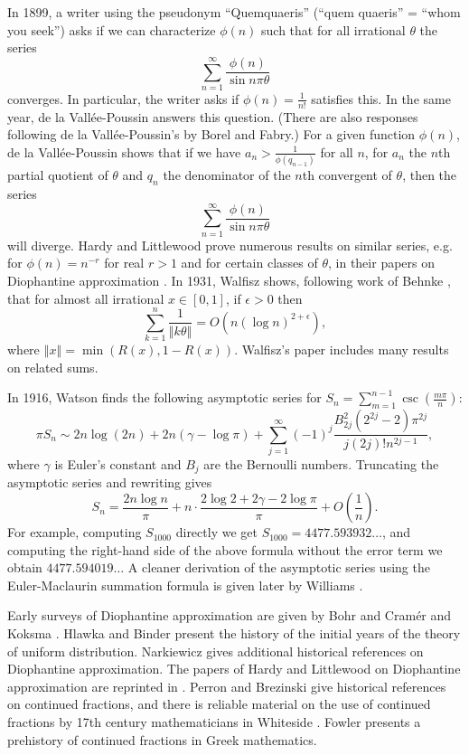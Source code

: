 \documentclass{article}
\newcommand{\norm}[1]{\left\Vert #1 \right\Vert}
\begin{document}
In 1899, a writer using the pseudonym ``Quemquaeris''  \cite{quemquaeris} (``quem quaeris'' = ``whom you seek'') asks if we can characterize $\phi(n)$ such that for
all  irrational $\theta$
the series
\[
\sum_{n=1}^\infty \frac{\phi(n)}{\sin n\pi \theta}
\]
converges.
 In particular, the writer asks if $\phi(n)=\frac{1}{n!}$ satisfies this. In the same year, de la Vall\'ee-Poussin \cite{valleepoussin}
answers this question. (There are also responses following de la Vall\'ee-Poussin's by Borel and Fabry.) For a given function $\phi(n)$,
de la Vall\'ee-Poussin shows that if we have $a_n>\frac{1}{\phi(q_{n-1})}$ for all $n$,  for $a_n$ the $n$th partial quotient of $\theta$ and $q_n$ the denominator of the $n$th convergent of $\theta$,
then the series
\[
\sum_{n=1}^\infty \frac{\phi(n)}{\sin n\pi \theta}
\]
will diverge. Hardy and Littlewood prove numerous results on similar series, e.g. for $\phi(n)=n^{-r}$ for real $r>1$ and for certain classes of $\theta$, in their papers on Diophantine approximation \cite{collectedpapers}. 
In 1931, Walfisz  \cite[p.~570, Hilfssatz 4]{walfisz} shows, following work of Behnke \cite[p.~289, \S 16]{behnke1924}, that for almost all irrational $x\in [0,1]$, if $\epsilon>0$ then
\[
\sum_{k=1}^n \frac{1}{\norm{k\theta}} = O(n (\log n)^{2+\epsilon}),
\]
where $\norm{x}=\min(R(x),1-R(x))$.
Walfisz's paper includes many results on related sums.

In 1916, Watson \cite{watson}
finds the following asymptotic series for
$S_n=\sum_{m=1}^{n-1} \csc\left( \frac{m\pi}{n} \right)$:
\[
\pi S_n \sim 2n\log(2n)+2n(\gamma-\log \pi)+\sum_{j=1}^\infty (-1)^j \frac{B_{2j}^2 ( 2^{2j}-2)\pi^{2j}}{j(2j)! n^{2j-1}},
\]
where $\gamma$ is Euler's constant and $B_j$ are the Bernoulli numbers.
Truncating the asymptotic series and rewriting
gives
\[
S_n=\frac{2n\log n}{\pi}+n \cdot \frac{2\log 2+2\gamma-2\log \pi}{\pi}+O\left(\frac{1}{n}\right).
\]
For example, computing $S_{1000}$ directly we get $S_{1000}=4477.593932\ldots$, and computing the right-hand side of the above formula  without the error term we obtain
$4477.594019\ldots$
A cleaner derivation of the asymptotic series using the Euler-Maclaurin summation formula is given
later by Williams \cite{williams}.


Early surveys of Diophantine approximation are given by Bohr and Cram\'er \cite[pp.~833--836, \S 39]{bohr} and Koksma \cite[pp.~102--110]{koksma}.
Hlawka and Binder \cite{hlawka} present the history of the initial years of the theory of uniform distribution.
Narkiewicz \cite[pp.~82--95, \S 2.5 and pp.~175--183 \S 3.5]{narkiewicz} gives additional historical references on Diophantine approximation.
The papers of Hardy and Littlewood on Diophantine approximation are reprinted in \cite{collectedpapers}. Perron \cite{perron}
and Brezinski \cite{brezinski} give historical references on continued fractions,
and there is  reliable material on the use of continued fractions by 17th century mathematicians in Whiteside \cite{whiteside}.
Fowler \cite{fowler}
presents a  prehistory of continued fractions in Greek mathematics.
\end{document}
